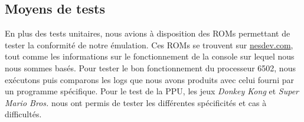 \subsection{Moyens de tests}

En plus des tests unitaires, nous avions à disposition des ROMs permettant de tester la conformité de notre émulation. Ces ROMs se trouvent sur \url{nesdev.com}, tout comme les informations sur le fonctionnement de la console sur lequel nous nous sommes basés. Pour tester le bon fonctionnement du processeur 6502, nous exécutons puis comparons les logs que nous avons produits avec celui fourni par un programme spécifique. Pour le test de la PPU, les jeux \emph{Donkey Kong} et \emph{Super Mario Bros.} nous ont permis de tester les différentes spécificités et cas à difficultés.
